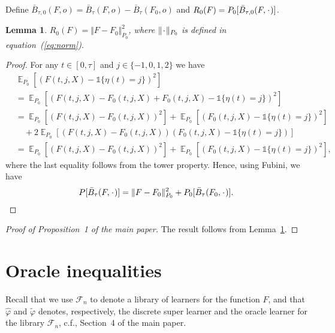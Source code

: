 \documentclass[11pt]{article}
\theoremstyle{thmstyleone}%
\newtheorem{lemma}{Lemma}
\theoremstyle{thmstyletwo}%
\theoremstyle{thmstylethree}%
\DeclareMathOperator{\E}{\mathbb{E}} %
\newcommand{\blank}{\makebox[1ex]{\textbf{$\cdot$}}}
\renewcommand{\phi}{\varphi}
\newcommand{\1}{\mathds{1}}
\begin{document}
Define
\( \bar{B}_{\tau,0}(F, o) = \bar{B}_{\tau}(F, o) - \bar{B}_{\tau}(F_0, o) \) and
\( R_{0}(F) = P_0{[\bar{B}_{\tau,0}(F, \blank)]} \).
\begin{lemma}
  \label{lemma:norm}
  \( R_{0}(F) = \Vert F - F_0 \Vert_{P_0}^2 \), where \( \Vert \blank \Vert_{P_0}\) is defined
  in equation~(\ref{eq:norm}).
\end{lemma}
\begin{proof}[Proof]
  For any \( t \in [0, \tau] \) and \( j\in \{-1,0,1,2\} \) we have
  \begin{align*}
    & \E_{P_0}{\left[ (F(t, j, X) - \1{\{\eta(t) = j \}})^2 \right]}
    \\
    & =    \E_{P_0}{\left[ (F(t, j, X) - F_0(t, j, X) + F_0(t, j, X) - \1{\{\eta(t) = j
      \}})^2 \right]}
    \\
    & =    \E_{P_0}{\left[ (F(t, j, X) - F_0(t, j, X))^2\right]}
      + \E_{P_0}{\left[ (F_0(t, j, X) - \1{\{\eta(t) = j \}})^2\right]}
    \\
    & \quad
      + 2\E_{P_0}{\left[ (F(t, j, X) - F_0(t, j, X))(F_0(t, j, X) - \1{\{\eta(t) = j
      \}})\right]}
    \\
    & =    \E_{P_0}{\left[ (F(t, j, X) - F_0(t, j, X))^2\right]}
      + \E_{P_0}{\left[ (F_0(t, j, X) - \1{\{\eta(t) = j \}})^2\right]},
  \end{align*}
  where the last equality follows from the tower property. Hence, using Fubini,
  we have
  \begin{equation*}
    P{[\bar{B}_{\tau}(F, \blank)]}
    = \Vert F - F_0 \Vert_{P_0}^2 + P_0{[\bar{B}_{\tau}(F_0, \blank)]}.
  \end{equation*}
\end{proof}

\begin{proof}[Proof of Proposition~1 of the main paper]
  The result follows from Lemma~\ref{lemma:norm}.
\end{proof}

\section{Oracle inequalities}
\label{sec:oracle-inequalities}

Recall that we use \( \mathcal{F}_n \) to denote a library of learners for the
function \( F \), and that \( \hat{\phi} \) and \( \tilde{\phi} \) denotes,
respectively, the discrete super learner and the oracle learner for the library
\( \mathcal{F}_n \), c.f., Section~4 of the main paper.
\end{document}
